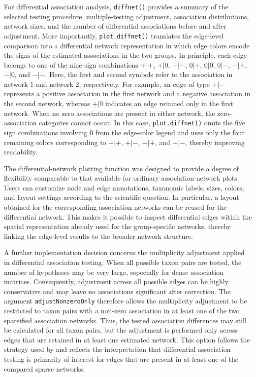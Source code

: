 For differential association analysis, \texttt{diffnet()} provides a summary of the selected testing procedure, multiple-testing adjustment, association distributions, network sizes, and the number of differential associations before and after adjustment. More importantly, \texttt{plot.diffnet()} translates the edge-level comparison into a differential network representation in which edge colors encode the signs of the estimated associations in the two groups. In principle, each edge belongs to one of the nine sign combinations $+|+$, $+|0$, $+|-$, $0|+$, $0|0$, $0|-$, $-|+$, $-|0$, and $-|-$. Here, the first and second symbols refer to the association in network 1 and network 2, respectively. For example, an edge of type $+|-$ represents a positive association in the first network and a negative association in the second network, whereas $+|0$ indicates an edge retained only in the first network. When no zero associations are present in either network, the zero-association categories cannot occur. In this case, \texttt{plot.diffnet()} omits the five sign combinations involving $0$ from the edge-color legend and uses only the four remaining colors corresponding to $+|+$, $+|-$, $-|+$, and $-|-$, thereby improving readability.

The differential-network plotting function was designed to provide a degree of flexibility comparable to that available for ordinary association-network plots. Users can customize node and edge annotations, taxonomic labels, sizes, colors, and layout settings according to the scientific question. In particular, a layout obtained for the corresponding association networks can be reused for the differential network. This makes it possible to inspect differential edges within the spatial representation already used for the group-specific networks, thereby linking the edge-level results to the broader network structure.

A further implementation decision concerns the multiplicity adjustment applied in differential association testing. When all possible taxon pairs are tested, the number of hypotheses may be very large, especially for dense association matrices. Consequently, adjustment across all possible edges can be highly conservative and may leave no associations significant after correction. The argument \texttt{adjustNonzeroOnly} therefore allows the multiplicity adjustment to be restricted to taxon pairs with a non-zero association in at least one of the two sparsified association networks. Thus, the tested association differences may still be calculated for all taxon pairs, but the adjustment is performed only across edges that are retained in at least one estimated network. This option follows the strategy used by \citet{sommer2022randomizationbased} and reflects the interpretation that differential association testing is primarily of interest for edges that are present in at least one of the compared sparse networks.

